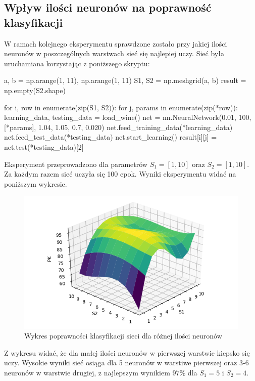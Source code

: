 \documentclass[a4paper,12pt]{article}
\numberwithin{equation}{section}
\begin{document}
\subsection{Wpływ ilości neuronów na poprawność klasyfikacji}

W ramach kolejnego eksperymentu sprawdzone zostało przy jakiej ilości neuronów w poszczególnych warstwach sieć się najlepiej uczy. Sieć była uruchamiana korzystając z poniższego skryptu:

\begin{pythoncode}
a, b = np.arange(1, 11), np.arange(1, 11)
S1, S2 = np.meshgrid(a, b)
result = np.empty(S2.shape)

for i, row in enumerate(zip(S1, S2)):
    for j, params in enumerate(zip(*row)):
        learning_data, testing_data = load_wine()
        net = nn.NeuralNetwork(0.01, 100, [*params], 1.04, 1.05, 0.7, 0.020)
        net.feed_training_data(*learning_data)
        net.feed_test_data(*testing_data)
        net.start_learning()
        result[i][j] = net.test(*testing_data)[2]
\end{pythoncode}

Eksperyment przeprowadzono dla parametrów $S_1=[1,10]$ oraz $S_2=[1,10]$. Za każdym razem sieć uczyła się 100 epok. Wyniki eksperymentu widać na poniższym wykresie.

\begin{figure}[h]
    \centering
    \includegraphics[width=\textwidth]{exp_3.png}
    \caption{Wykres poprawności klasyfikacji sieci dla różnej ilości neuronów}
    \label{fig:exp_3}
\end{figure}

Z wykresu widać, że dla małej ilości neuronów w pierwszej warstwie kiepsko się uczy. Wysokie wyniki sieć osiąga dla 5 neuronów w warstiwe pierwszej oraz 3-6 neuronów w warstwie drugiej, z najlepszym wynikiem 97\% dla $S_1=5$ i $S_2=4$.
\end{document}
